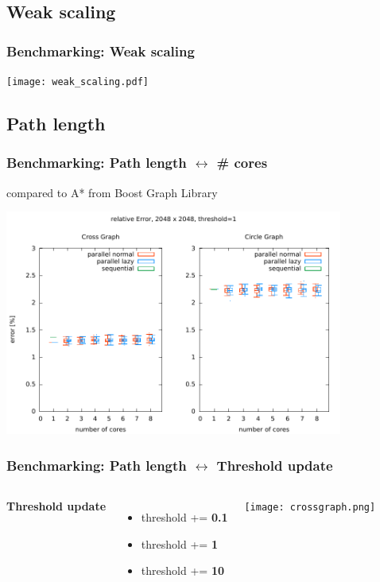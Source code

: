 \documentclass{beamer}
\begin{document}
\subsection{Weak scaling}
\begin{frame}
\frametitle{Benchmarking: Weak scaling}
\begin{center}
	\texttt{[image: weak\_scaling.pdf]}
\end{center}
\end{frame}

\subsection{Path length}
\begin{frame}
\frametitle{Benchmarking: Path length $\leftrightarrow$ \# cores}
compared to A* from Boost Graph Library
\begin{center}
	\includegraphics[height=210pt]{error_cores.pdf}
\end{center}
\end{frame}


\begin{frame}
\frametitle{Benchmarking: Path length $\leftrightarrow$ Threshold update}
\begin{columns}[c] %
\textbf{Threshold update}
\begin{itemize}
\item \textcolor{0.1}{threshold += \textbf{0.1}}
\item \textcolor{1}{threshold += \textbf{1}}
\item \textcolor{10}{threshold += \textbf{10}}
\end{itemize}

\begin{center}
	\texttt{[image: crossgraph.png]}
\end{center}
\end{columns}
\end{frame}
\end{document}
